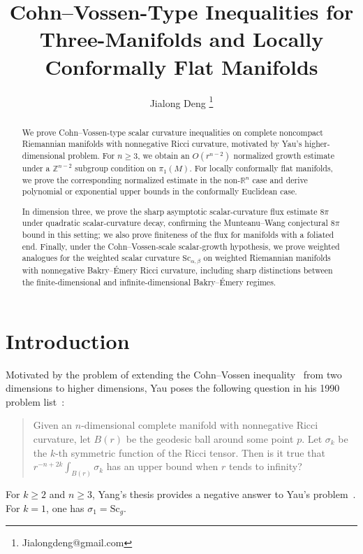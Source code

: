 \documentclass[12pt,oneside,a4paper]{article}
\theoremstyle{mytheorem}
\theoremstyle{remark}
\begin{document}
\title{Cohn--Vossen-Type Inequalities for Three-Manifolds and Locally Conformally Flat Manifolds}
\author{Jialong Deng \thanks{Jialongdeng@gmail.com}}
\date{}

\maketitle


\begin{abstract}
We prove Cohn--Vossen-type scalar curvature inequalities on complete
noncompact Riemannian manifolds with nonnegative Ricci curvature, motivated by
Yau's higher-dimensional problem. For \(n\ge3\), we obtain an
\(O(r^{n-2})\) normalized growth estimate under a \(\mathbb Z^{n-2}\) subgroup
condition on \(\pi_1(M)\). For locally conformally flat manifolds, we prove
the corresponding normalized estimate in the non-\(\mathbb R^n\) case and
derive polynomial or exponential upper bounds in the conformally Euclidean
case.

In dimension three, we prove the sharp asymptotic scalar-curvature flux
estimate \(8\pi\) under quadratic scalar-curvature decay,
confirming  the Munteanu--Wang conjectural \(8\pi\) bound in this
setting; we also prove finiteness of the flux for manifolds with a foliated
end. Finally, under the Cohn--Vossen-scale scalar-growth hypothesis, we prove
weighted analogues for the weighted scalar curvature \(\mathrm{Sc}_{\alpha,\beta}\) on weighted Riemannian manifolds with nonnegative Bakry--\'Emery Ricci curvature, including
sharp distinctions between the finite-dimensional and infinite-dimensional
Bakry--\'Emery regimes.
\end{abstract}







\tableofcontents
\section{Introduction}

Motivated by the problem of extending the Cohn--Vossen
inequality~\cite{zbMATH02533557} from two dimensions to higher
dimensions, Yau poses the following question in his 1990 problem
list~\cite[Problem~9]{MR1216573}:
\begin{quote}
Given an $n$-dimensional complete manifold with nonnegative Ricci
curvature, let $B(r)$ be the geodesic ball around some point $p$.  Let
$\sigma_k$ be the $k$-th symmetric function of the Ricci tensor.  Then
is it true that $r^{-n+2k}\int_{B(r)}\sigma_k$ has an upper bound when
$r$ tends to infinity?
\end{quote}
For \(k\ge 2\) and \(n\ge 3\), Yang's thesis provides a negative answer to Yau's problem~\cite{MR3010146}.  For $k=1$, one has $\sigma_1=\mathrm{Sc}_g$.
\end{document}

